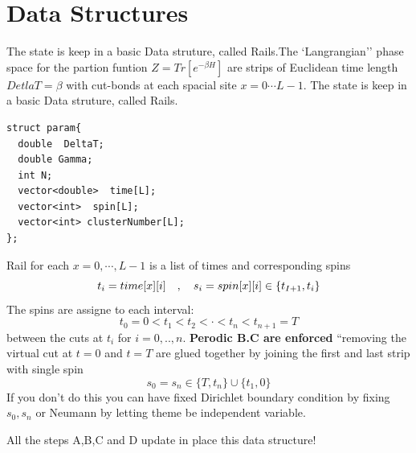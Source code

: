 \documentclass[12pt]{article}
\numberwithin{equation}{section}
\numberwithin{figure}{section}
\newcommand{\be}{\begin{equation}}
\newcommand{\ee}{\end{equation}}
\newcommand{\<}{\langle\,}
\renewcommand{\>}{\rangle}
\begin{document}
\section{ Data Structures}

The state is keep in a basic Data struture, called Rails.The
`Langrangian''  phase space for the partion funtion $Z = Tr[ e^ {
  -\beta  H}] $ are strips of Euclidean time length $DetlaT = \beta$ with
cut-bonds at each spacial site $x = 0\cdots  L-1$. The state is keep in
a basic Data struture, called Rails.
\begin{verbatim}
struct param{
  double  DeltaT;
  double Gamma;
  int N;
  vector<double>  time[L];
  vector<int>  spin[L];
  vector<int> clusterNumber[L];
};
\end{verbatim}
Rail for each $x = 0,\cdots, L-1$ is  a  list of times and corresponding spins 
\be
t_i = {\sc time}[x][i]  \quad, \quad s_i = {\sc spin}[x][i] \in \{t_{I+1}, t_i\}
\ee
 The spins are assigne to each interval:
\be
t_0 = 0 < t_1 <  t_2< \cdot < t_n <  t_{n+1} = T 
\ee 
between the cuts at $t_i$ for $i = 0,..,n$. 
{\bf Perodic B.C are enforced}  ``removing the virtual cut at $t = 0$
and $t = T$ are glued together by  joining the first and last strip  with single spin
\be
s_0 = s_n \in \{T, t_n\} \cup  \{t_1, 0\}
\ee
If you don't do this you can have fixed Dirichlet boundary condition by fixing
$s_0, s_n$ or Neumann by letting theme be independent variable.

All the steps A,B,C and D update in place this data structure!
\end{document}

